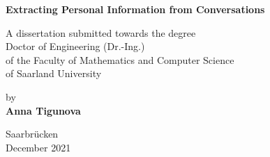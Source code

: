 
\frontmatter%
\begin{titlepage}

\def\docdate{2018}

\newlength{\longskip}
\setlength{\longskip}{0.03\textheight}

\rmfamily
{}

\begin{center}

\hrulefill\par
\huge{
    \vspace{0.5cm}
 \textbf{Extracting Personal Information from Conversations} \\
      }
\hrulefill\par
{}


\Large
A dissertation submitted towards the degree \\
Doctor of Engineering (Dr.-Ing.) \\
of the Faculty of Mathematics and Computer Science \\
of Saarland University


by \\
\textbf{Anna Tigunova}





Saarbr\"ucken\\ 
December 2021
\end{center}

\end{titlepage}

